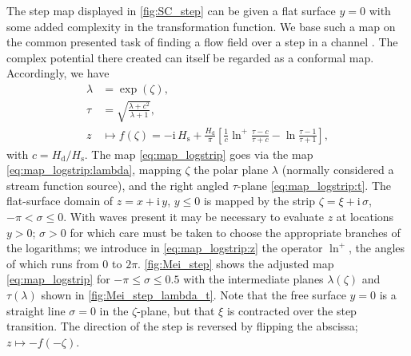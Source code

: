 \documentclass[internal]{sintefmemo}
\newcommand{\mr}{\mathrm}
\let\SSS\S
\renewcommand{\S}{^\mr{S}}
\newcommand{\ii}{\mr{i}\,}
\renewcommand{\_}[1]{_\mr{#1}}
\newcommand{\z}{z}
\newcommand{\x}{x}
\newcommand{\y}{y}
\newcommand{\zz}{\zeta}
\newcommand{\xx}{\xi}
\newcommand{\yy}{\sigma}
\newcommand{\zmap}{f}
\begin{document}
The step map displayed in \autoref{fig:SC_step} can be given a flat surface $y=0$ with some added complexity in the transformation function.
We base such a map on the common presented task of finding a flow field over a step in a channel \citep[e.g.,][\SSS 4.3.2]{mei_2005}.
The complex potential there created can itself be regarded as a conformal map.
Accordingly, we have
\begin{subequations}
\begin{align}
\lambda &= \exp(\zz),\label{eq:map_logstrip:lambda}\\
\tau &= \sqrt{\frac{\lambda+c^2}{\lambda+1} },\label{eq:map_logstrip:t}\\
z &\mapsto \zmap(\zz) = -\ii H\_s +\frac{H\_d}{\pi}\left[ 
\frac1c \ln^+\frac{\tau-c}{\tau+c} - \ln\frac{\tau-1}{\tau+1}
\right]\label{eq:map_logstrip:z},
\end{align}%
\label{eq:map_logstrip}%
\end{subequations}%
with $c = H\_d/H\_s$.
The map \eqref{eq:map_logstrip} goes via the map \eqref{eq:map_logstrip:lambda}, mapping $\zz$ the polar plane $\lambda$ (normally considered a stream function source), and the right angled $\tau$-plane \eqref{eq:map_logstrip:t}.
The flat-surface domain of $z=\x+\ii\y$, $\y\leq0$ is mapped by the strip $\zz=\xx+\ii\yy$, $-\pi<\yy\leq0$.
With waves present it may be necessary to evaluate $\z$ at locations $\y>0$; $\yy>0$ for which care must be taken to choose the appropriate branches of the logarithms;
we introduce in \eqref{eq:map_logstrip:z} the operator $\ln^+$, the angles of which runs from $0$ to $2\pi$. 
\autoref{fig:Mei_step} shows the adjusted map \eqref{eq:map_logstrip} for $-\pi\leq\yy\leq0.5$ with the intermediate planes $\lambda(\zz)$ and $\tau(\lambda)$ shown in \autoref{fig:Mei_step_lambda_t}.
Note that the free surface $\y=0$ is a straight line  $\yy=0$ in the $\zz$-plane, but that $\xx$ is contracted over the step transition.
The direction of the step is reversed by flipping the abscissa; $z\mapsto-f(-\zz)$.  
\end{document}
